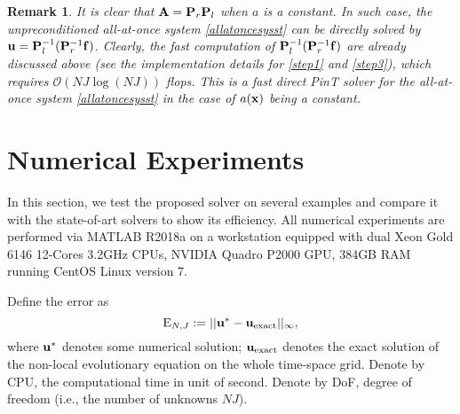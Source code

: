 \documentclass[11pt]{article}%
\numberwithin{equation}{section}
\newtheorem{remark}{Remark}
\begin{document}
\begin{remark}\label{fastdirctsolrem}
It is clear that ${\bf A}={\bf P}_r{\bf P}_l$ when $a$ is a constant. In such case, the unpreconditioned all-at-once system \eqref{allatoncesysst} can be directly solved by ${\bf u}={\bf P}_l^{-1}({\bf P}_r^{-1}{\bf f})$. Clearly, the fast computation of ${\bf P}_l^{-1}({\bf P}_r^{-1}{\bf f})$ are already discussed above (see the implementation details for \eqref{step1} and \eqref{step3}), which requires $\mathcal{O}(NJ\log(NJ))$ flops. This is a fast direct PinT solver for the all-at-once system \eqref{allatoncesysst} in the case of $a({\bf x})$ being a constant.
\end{remark}



\section{Numerical Experiments}\label{experimentsection}
In this section, we test the proposed solver on several examples and compare it with the state-of-art solvers to show its efficiency. 
All numerical experiments are performed via MATLAB R2018a on a workstation equipped with dual Xeon Gold 6146 12-Cores 3.2GHz CPUs, NVIDIA Quadro P2000 GPU, 384GB RAM running CentOS Linux version 7.


Define the error as
\begin{equation*}
{\rm E}_{N,J}:=||{\bf u}^{*}-{\bf u}_{{\rm exact}}||_{\infty},
\end{equation*}
where ${\bf u}^{*}$ denotes some numerical solution; ${\bf u}_{{\rm exact}}$ denotes the exact solution of the non-local evolutionary equation on the whole time-space grid. Denote by CPU, the computational time in unit of second. Denote by DoF, degree of freedom (i.e., the number of unknowns $NJ$).
\end{document}
